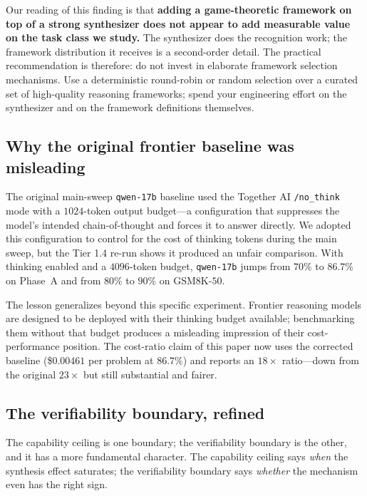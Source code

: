 \documentclass[11pt]{amsart}
\newcommand\1{{\mathds{1}}}
\theoremstyle{definition}
\theoremstyle{remark}
\numberwithin{equation}{section}
\begin{document}
Our reading of this finding is that \textbf{adding a game-theoretic framework on top of a strong synthesizer does not appear to add measurable value on the task class we study.}
The synthesizer does the recognition work; the framework distribution it receives is a second-order detail.
The practical recommendation is therefore: do not invest in elaborate framework selection mechanisms. Use a deterministic round-robin or random selection over a curated set of high-quality reasoning frameworks; spend your engineering effort on the synthesizer and on the framework definitions themselves.

\subsection{Why the original frontier baseline was misleading}\label{app:frontier}

The original main-sweep \texttt{qwen-17b} baseline used the Together AI \texttt{/no\_think} mode with a $1024$-token output budget---a configuration that suppresses the model's intended chain-of-thought and forces it to answer directly.
We adopted this configuration to control for the cost of thinking tokens during the main sweep, but the Tier 1.4 re-run shows it produced an unfair comparison.
With thinking enabled and a $4096$-token budget, \texttt{qwen-17b} jumps from $70\%$ to $86.7\%$ on Phase~A and from $80\%$ to $90\%$ on GSM8K-$50$.

The lesson generalizes beyond this specific experiment.
Frontier reasoning models are designed to be deployed with their thinking budget available; benchmarking them without that budget produces a misleading impression of their cost-performance position.
The cost-ratio claim of this paper now uses the corrected baseline (\$$0.00461$ per problem at $86.7\%$) and reports an $18\times$ ratio---down from the original $23\times$ but still substantial and fairer.

\subsection{The verifiability boundary, refined}\label{app:why-verifiability}

The capability ceiling is one boundary; the verifiability boundary is the other, and it has a more fundamental character.
The capability ceiling says \emph{when} the synthesis effect saturates; the verifiability boundary says \emph{whether} the mechanism even has the right sign.
\end{document}

